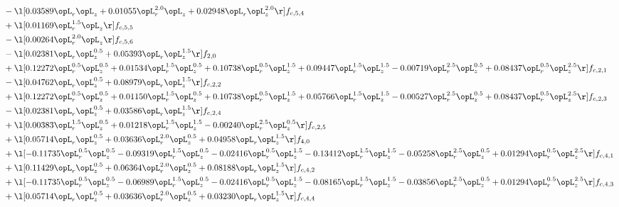 \begin{alignat}{2}
& - \l[  0.03589 \opL_r \opL_z +  0.01055 \opL_r^{2.0} \opL_z +  0.02948 \opL_r \opL_z^{2.0}  \r] f_{c,5,4} \nonumber \\ 
& + \l[  0.01169 \opL_r^{1.5} \opL_z  \r] f_{c,5,5} \nonumber \\ 
& - \l[  0.00264 \opL_r^{2.0} \opL_z  \r] f_{c,5,6} \nonumber \\ 
& - \l[  0.02381 \opL_r \opL_z^{0.5} +  0.05393 \opL_r \opL_z^{1.5}  \r] f_{2,0} \nonumber \\ 
& + \l[  0.12272 \opL_r^{0.5} \opL_z^{0.5} +  0.01534 \opL_r^{1.5} \opL_z^{0.5} +  0.10738 \opL_r^{0.5} \opL_z^{1.5} +  0.09447 \opL_r^{1.5} \opL_z^{1.5}   -0.00719 \opL_r^{2.5} \opL_z^{0.5} +  0.08437 \opL_r^{0.5} \opL_z^{2.5}  \r] f_{c,2,1} \nonumber \\ 
& - \l[  0.04762 \opL_r \opL_z^{0.5} +  0.08979 \opL_r \opL_z^{1.5}  \r] f_{c,2,2} \nonumber \\ 
& + \l[  0.12272 \opL_r^{0.5} \opL_z^{0.5} +  0.01150 \opL_r^{1.5} \opL_z^{0.5} +  0.10738 \opL_r^{0.5} \opL_z^{1.5} +  0.05766 \opL_r^{1.5} \opL_z^{1.5}   -0.00527 \opL_r^{2.5} \opL_z^{0.5} +  0.08437 \opL_r^{0.5} \opL_z^{2.5}  \r] f_{c,2,3} \nonumber \\ 
& - \l[  0.02381 \opL_r \opL_z^{0.5} +  0.03586 \opL_r \opL_z^{1.5}  \r] f_{c,2,4} \nonumber \\ 
& + \l[  0.00383 \opL_r^{1.5} \opL_z^{0.5} +  0.01218 \opL_r^{1.5} \opL_z^{1.5}   -0.00240 \opL_r^{2.5} \opL_z^{0.5}  \r] f_{c,2,5} \nonumber \\ 
& + \l[  0.05714 \opL_r \opL_z^{0.5} +  0.03636 \opL_r^{2.0} \opL_z^{0.5} +  0.04958 \opL_r \opL_z^{1.5}  \r] f_{4,0} \nonumber \\ 
& + \l[  -0.11735 \opL_r^{0.5} \opL_z^{0.5}   -0.09319 \opL_r^{1.5} \opL_z^{0.5}   -0.02416 \opL_r^{0.5} \opL_z^{1.5}   -0.13412 \opL_r^{1.5} \opL_z^{1.5}   -0.05258 \opL_r^{2.5} \opL_z^{0.5} +  0.01294 \opL_r^{0.5} \opL_z^{2.5}  \r] f_{c,4,1} \nonumber \\ 
& + \l[  0.11429 \opL_r \opL_z^{0.5} +  0.06364 \opL_r^{2.0} \opL_z^{0.5} +  0.08188 \opL_r \opL_z^{1.5}  \r] f_{c,4,2} \nonumber \\ 
& + \l[  -0.11735 \opL_r^{0.5} \opL_z^{0.5}   -0.06989 \opL_r^{1.5} \opL_z^{0.5}   -0.02416 \opL_r^{0.5} \opL_z^{1.5}   -0.08165 \opL_r^{1.5} \opL_z^{1.5}   -0.03856 \opL_r^{2.5} \opL_z^{0.5} +  0.01294 \opL_r^{0.5} \opL_z^{2.5}  \r] f_{c,4,3} \nonumber \\ 
& + \l[  0.05714 \opL_r \opL_z^{0.5} +  0.03636 \opL_r^{2.0} \opL_z^{0.5} +  0.03230 \opL_r \opL_z^{1.5}  \r] f_{c,4,4} \nonumber \\ 

\end{alignat}

